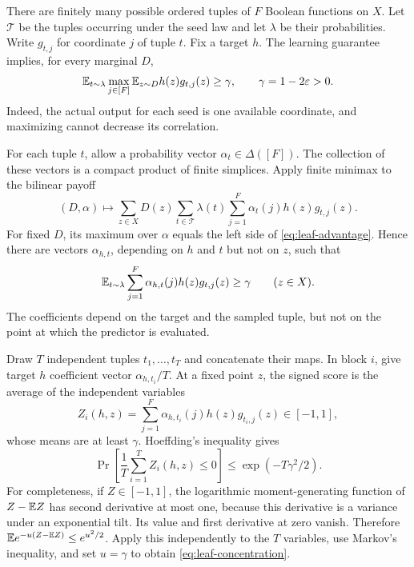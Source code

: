 There are finitely many possible ordered tuples of $F$ Boolean functions on $X$. Let $\mathcal T$ be the tuples occurring under the seed law and let $\lambda$ be their probabilities. Write $g_{t,j}$ for coordinate $j$ of tuple $t$. Fix a target $h$. The learning guarantee implies, for every marginal $D$,
\begin{equation}
 \mathbb E_{t\sim\lambda}\max_{j\in[F]}\mathbb E_{z\sim D}h(z)g_{t,j}(z)\ge\gamma,
 \qquad \gamma=1-2\varepsilon>0.
 \label{eq:leaf-advantage}
\end{equation}
Indeed, the actual output for each seed is one available coordinate, and maximizing cannot decrease its correlation.

For each tuple $t$, allow a probability vector $\alpha_t\in\Delta([F])$. The collection of these vectors is a compact product of finite simplices. Apply finite minimax to the bilinear payoff
\[
 (D,\alpha)\longmapsto
 \sum_{z\in X}D(z)\sum_{t\in\mathcal T}\lambda(t)
       \sum_{j=1}^F\alpha_t(j)h(z)g_{t,j}(z).
\]
For fixed $D$, its maximum over $\alpha$ equals the left side of \eqref{eq:leaf-advantage}. Hence there are vectors $\alpha_{h,t}$, depending on $h$ and $t$ but not on $z$, such that
\begin{equation}
 \mathbb E_{t\sim\lambda}\sum_{j=1}^F\alpha_{h,t}(j)h(z)g_{t,j}(z)\ge\gamma
 \qquad(z\in X).
 \label{eq:pointwise-advantage}
\end{equation}
The coefficients depend on the target and the sampled tuple, but not on the point at which the predictor is evaluated.

Draw $T$ independent tuples $t_1,\ldots,t_T$ and concatenate their maps. In block $i$, give target $h$ coefficient vector $\alpha_{h,t_i}/T$. At a fixed point $z$, the signed score is the average of the independent variables
\[
 Z_i(h,z)=\sum_{j=1}^F\alpha_{h,t_i}(j)h(z)g_{t_i,j}(z)\in[-1,1],
\]
whose means are at least $\gamma$. Hoeffding's inequality \citep{Hoeffding63} gives
\begin{equation}
 \Pr\left[\frac1T\sum_{i=1}^TZ_i(h,z)\le0\right]
 \le\exp(-T\gamma^2/2).
 \label{eq:leaf-concentration}
\end{equation}
For completeness, if $Z\in[-1,1]$, the logarithmic moment-generating function of $Z-\mathbb E Z$ has second derivative at most one, because this derivative is a variance under an exponential tilt. Its value and first derivative at zero vanish. Therefore $\mathbb E e^{-u(Z-\mathbb E Z)}\le e^{u^2/2}$. Apply this independently to the $T$ variables, use Markov's inequality, and set $u=\gamma$ to obtain \eqref{eq:leaf-concentration}.

